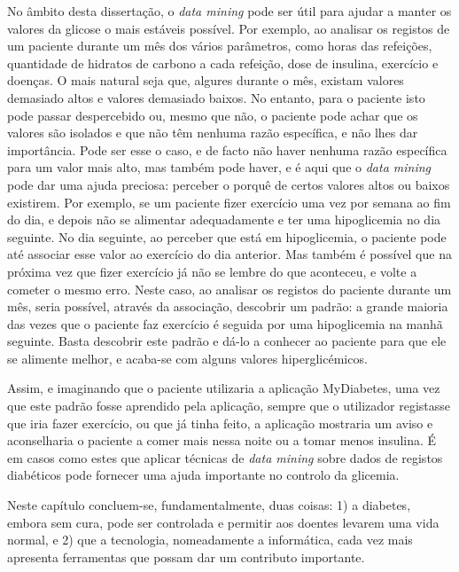 No âmbito desta dissertação, o \textit{data mining} pode ser útil para ajudar a manter os valores da glicose o mais estáveis possível. Por exemplo, ao analisar os registos de um paciente durante um mês dos vários parâmetros, como horas das refeições, quantidade de hidratos de carbono a cada refeição, dose de insulina, exercício e doenças. O mais natural seja que, algures durante o mês, existam valores demasiado altos e valores demasiado baixos. 
No entanto, para o paciente isto pode passar despercebido ou, mesmo que não, o paciente pode achar que os valores são isolados e que não têm nenhuma razão específica, e não lhes dar importância. Pode ser esse o caso, e de facto não haver nenhuma razão específica para um valor mais alto, mas também pode haver, e é aqui que o \textit{data mining} pode dar uma ajuda preciosa:  perceber o porquê de certos valores altos ou baixos existirem. Por exemplo, se um paciente fizer exercício uma vez por semana ao fim do dia, e depois não se alimentar adequadamente e ter uma hipoglicemia no dia seguinte. No dia seguinte, ao perceber que está em hipoglicemia, o paciente pode até associar esse valor ao exercício do dia anterior. Mas também é possível que na próxima vez que fizer exercício já não se lembre do que aconteceu, e volte a cometer o mesmo erro. 
Neste caso, ao analisar os registos do paciente durante um mês, seria possível, através da associação, descobrir um padrão: a grande maioria das vezes que o paciente faz exercício é seguida por uma hipoglicemia na manhã seguinte. Basta descobrir este padrão e dá-lo a conhecer ao paciente para que ele se alimente melhor, e acaba-se com alguns valores hiperglicémicos. 

Assim, e imaginando que o paciente utilizaria a aplicação MyDiabetes, uma vez que este padrão fosse aprendido pela aplicação, sempre que o utilizador registasse que iria fazer exercício, ou que já tinha feito, a aplicação mostraria um aviso e aconselharia o paciente a comer mais nessa noite ou a tomar menos insulina. É em casos como estes que aplicar técnicas de \textit{data mining} sobre dados de registos diabéticos pode fornecer uma ajuda importante no controlo da glicemia.\newline

Neste capítulo concluem-se, fundamentalmente, duas coisas: 1) a diabetes, embora sem cura, pode ser controlada e permitir aos doentes levarem uma vida normal, e 2) que a tecnologia, nomeadamente a informática, cada vez mais apresenta ferramentas que possam dar um contributo importante. 

